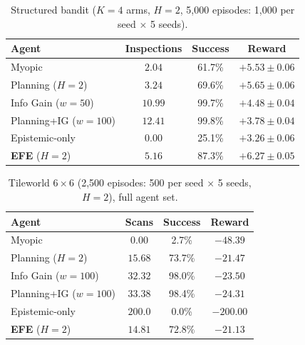 \documentclass[runningheads]{llncs}
\begin{document}
\begin{table}[h]
\centering
\caption{Structured bandit ($K{=}4$ arms, $H{=}2$, 5{,}000 episodes: 1{,}000 per seed $\times$ 5 seeds).}
\begin{small}
\begin{tabular}{lccc}
\toprule
Agent & Inspections & Success & Reward \\
\midrule
Myopic & $2.04$ & 61.7\% & $+5.53 \pm 0.06$ \\
Planning ($H{=}2$) & $3.24$ & 69.6\% & $+5.65 \pm 0.06$ \\
Info Gain ($w{=}50$) & $10.99$ & 99.7\% & $+4.48 \pm 0.04$ \\
Planning+IG ($w{=}100$) & $12.41$ & 99.8\% & $+3.78 \pm 0.04$ \\
Epistemic-only & $0.00$ & 25.1\% & $+3.26 \pm 0.06$ \\
\textbf{EFE} ($H{=}2$) & $\mathbf{5.16}$ & $\mathbf{87.3\%}$ & $\mathbf{+6.27 \pm 0.05}$ \\
\bottomrule
\end{tabular}
\end{small}
\end{table}

\begin{table}[h]
\centering
\caption{Tileworld $6{\times}6$ (2{,}500 episodes: 500 per seed $\times$ 5 seeds, $H{=}2$), full agent set.}
\begin{small}
\begin{tabular}{lccc}
\toprule
Agent & Scans & Success & Reward \\
\midrule
Myopic & $0.00$ & 2.7\% & $-48.39$ \\
Planning ($H{=}2$) & $15.68$ & 73.7\% & $-21.47$ \\
Info Gain ($w{=}100$) & $32.32$ & 98.0\% & $-23.50$ \\
Planning+IG ($w{=}100$) & $33.38$ & 98.4\% & $-24.31$ \\
Epistemic-only & $200.0$ & 0.0\% & $-200.00$ \\
\textbf{EFE} ($H{=}2$) & $\mathbf{14.81}$ & $\mathbf{72.8\%}$ & $\mathbf{-21.13}$ \\
\bottomrule
\end{tabular}
\end{small}
\end{table}
\end{document}
